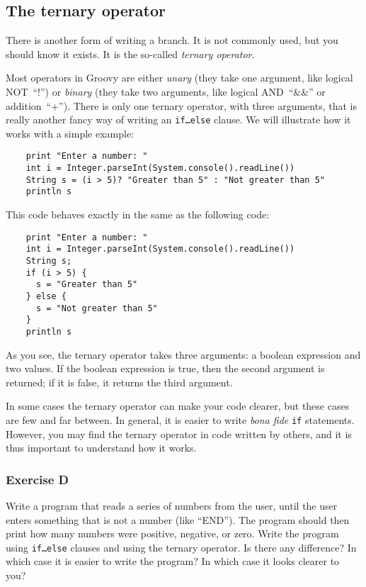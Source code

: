 \subsection{The ternary operator}
\label{sec:ternary-operator}

There is another form of writing a branch. It is not commonly used,
but you should know it exists. It is the so-called \emph{ternary
  operator}. 

Most operators in Groovy are either \emph{unary} (they take one
argument, like logical NOT~``!'') or \emph{binary} (they take two
arguments, like logical AND~``\&\&'' or addition~``+''). There is only
one ternary operator, with three arguments, that is really another
fancy way of writing an \texttt{if\ldots else} clause. We will
illustrate how it works with a simple example:

\begin{verbatim}
    print "Enter a number: "
    int i = Integer.parseInt(System.console().readLine())
    String s = (i > 5)? "Greater than 5" : "Not greater than 5"
    println s
\end{verbatim}

This code behaves exactly in the same as the following code:

\begin{verbatim}
    print "Enter a number: "
    int i = Integer.parseInt(System.console().readLine())
    String s;
    if (i > 5) {
      s = "Greater than 5"
    } else {
      s = "Not greater than 5"
    }
    println s
\end{verbatim}

As you see, the ternary operator takes three arguments: a boolean
expression and two values. If the boolean expression is true, then the
second argument is returned; if it is false, it returns the third
argument. 

In some cases the ternary operator can make your code clearer, but
these cases are few and far between. In general, it is easier to write
\emph{bona fide} \texttt{if} statements. However, you may find the
ternary operator in code written by others, and it is thus important
to understand how it works. 

\subsubsection*{Exercise D}

Write a program that reads a series of numbers from the user, until the
user enters something that is not a number (like ``END''). The program
should then print how many numbers were positive, negative, or
zero. Write the program using \texttt{if\ldots else} clauses and using
the ternary operator. Is there any difference? In which case it is
easier to write the program? In which case it looks clearer to you? 




